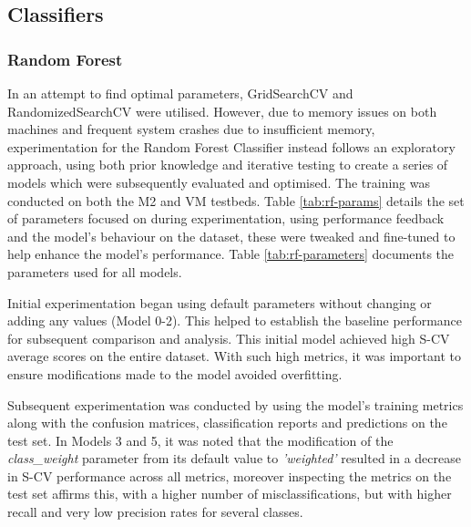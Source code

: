 \subsection{Classifiers}


\subsubsection{Random Forest}
\label{sec:RF}

In an attempt to find optimal parameters, GridSearchCV and RandomizedSearchCV were utilised. However, due to memory issues on both machines and frequent system crashes due to insufficient memory, experimentation for the Random Forest Classifier instead follows an exploratory approach, using both prior knowledge and iterative testing to create a series of models which were subsequently evaluated and optimised. The training was conducted on both the M2 and VM testbeds. Table \ref{tab:rf-params} details the set of parameters focused on during experimentation, using performance feedback and the model's behaviour on the dataset, these were tweaked and fine-tuned to help enhance the model's performance. Table \ref{tab:rf-parameters} documents the parameters used for all models.

\medskip

Initial experimentation began using default parameters without changing or adding any values (Model 0-2). This helped to establish the baseline performance for subsequent comparison and analysis. This initial model achieved high S-CV average scores on the entire dataset. With such high metrics, it was important to ensure modifications made to the model avoided overfitting. 

\medskip

Subsequent experimentation was conducted by using the model's training metrics along with the confusion matrices, classification reports and predictions on the test set. In Models 3 and 5, it was noted that the modification of the \textit{class\_weight} parameter from its default value to \textit{'weighted'} resulted in a decrease in S-CV performance across all metrics, moreover inspecting the metrics on the test set affirms this, with a higher number of misclassifications, but with higher recall and very low precision rates for several classes. 

